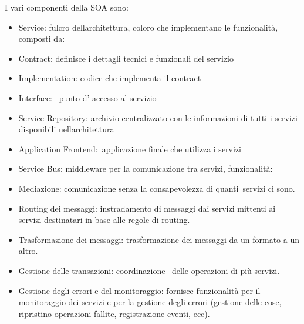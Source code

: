 \documentclass[
]{article}
\providecommand{\tightlist}{%
  \setlength{\itemsep}{0pt}\setlength{\parskip}{0pt}}
\begin{document}
{}

{I vari componenti della SOA sono:}

\begin{itemize}
\tightlist
\item
  {Service}{: fulcro dell\textquotesingle architettura, coloro che
  implementano le funzionalità, composti da:}
\end{itemize}

\begin{itemize}
\tightlist
\item
  {Contract}{: definisce i dettagli tecnici e funzionali del servizio}
\item
  {Implementation}{: codice che implementa il contract}
\item
  {Interface}{: ~punto d' accesso al servizio}
\end{itemize}

\begin{itemize}
\tightlist
\item
  {Service Repository}{: archivio centralizzato con le informazioni di
  tutti i servizi disponibili nell\textquotesingle architettura }
\end{itemize}

{}

\begin{itemize}
\tightlist
\item
  {Application }{Frontend}{:}{~applicazione finale che utilizza i
  servizi}
\end{itemize}

{}

\begin{itemize}
\tightlist
\item
  {Service Bus}{: middleware per la comunicazione tra servizi,
  funzionalità:}
\end{itemize}

\begin{itemize}
\tightlist
\item
  {Mediazione}{: comunicazione senza la consapevolezza di
  }{quanti}{~servizi ci sono.}
\item
  {Routing dei messaggi}{: instradamento di messaggi dai servizi
  mittenti ai servizi destinatari in base alle regole di routing.}
\item
  {Trasformazione dei messaggi}{: trasformazione dei messaggi da un
  formato a un altro.}
\item
  {Gestione delle transazioni}{: coordinazione ~delle operazioni di più
  servizi.}
\item
  {Gestione degli errori e del monitoraggio: }{fornisce funzionalità per
  il monitoraggio dei servizi e per la gestione degli errori (gestione
  delle cose, ripristino operazioni fallite, registrazione eventi,
  ecc).}
\end{itemize}
\end{document}
